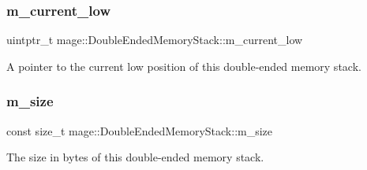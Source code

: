 \subsubsection{\texorpdfstring{m\+\_\+current\+\_\+low}{m\_current\_low}}
{\footnotesize\ttfamily uintptr\+\_\+t mage\+::\+Double\+Ended\+Memory\+Stack\+::m\+\_\+current\+\_\+low\hspace{0.3cm}{\ttfamily [private]}}

A pointer to the current low position of this double-\/ended memory stack. \mbox{\label{classmage_1_1_double_ended_memory_stack_a3a3ff5dbdcca2fcd2939e8e92528abcc}} 
\subsubsection{\texorpdfstring{m\+\_\+size}{m\_size}}
{\footnotesize\ttfamily const size\+\_\+t mage\+::\+Double\+Ended\+Memory\+Stack\+::m\+\_\+size\hspace{0.3cm}{\ttfamily [private]}}

The size in bytes of this double-\/ended memory stack. 
